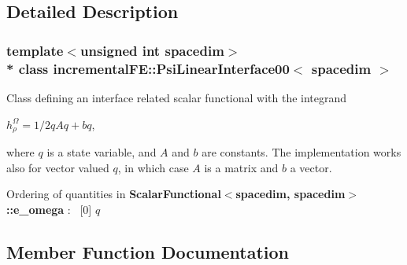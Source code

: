 \subsection{Detailed Description}
\subsubsection*{template$<$unsigned int spacedim$>$\\*
class incremental\+F\+E\+::\+Psi\+Linear\+Interface00$<$ spacedim $>$}

Class defining an interface related scalar functional with the integrand

$h^\Omega_\rho = 1/2 q A q + b q$,

where $q$ is a state variable, and $A$ and $b$ are constants. The implementation works also for vector valued $q$, in which case $A$ is a matrix and $b$ a vector.

Ordering of quantities in {\bf Scalar\+Functional$<$spacedim, spacedim$>$\+::e\+\_\+omega} \+:~\newline
 \mbox{[}0\mbox{]} $q$ 

\subsection{Member Function Documentation}
